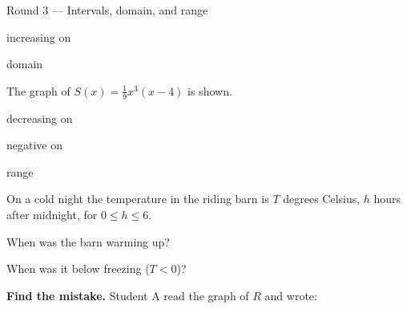 \begin{notesbox}{Round 3 --- Intervals, domain, and range}
\begin{minipage}[t]{0.62\linewidth}
\vspace{6pt}
increasing on 

\vspace{6pt}
domain \ans{$(-\infty,\,\infty)$}
\end{minipage}\hfill
\begin{minipage}[t]{0.34\linewidth}
\vspace{0pt}\centering
\gK[0.36]
\end{minipage}

\vspace{6pt}
\begin{minipage}[t]{0.62\linewidth}
\vspace{0pt}
\; The graph of $S(x)=\tfrac19x^3(x-4)$ is shown.

\vspace{6pt}
decreasing on 

\vspace{6pt}
negative on 

\vspace{6pt}
range \ans{$[-3,\,\infty)$}
\end{minipage}\hfill
\begin{minipage}[t]{0.34\linewidth}
\vspace{0pt}\centering
\gS[0.36]
\end{minipage}

\vspace{6pt}
\begin{minipage}[t]{0.62\linewidth}
\vspace{0pt}
\; On a cold night the temperature in the riding barn is $T$ degrees Celsius, $h$ hours
after midnight, for $0\le h\le6$.

\vspace{6pt}
When was the barn warming up? 

\vspace{6pt}
When was it below freezing ($T<0$)? \ans{$[0,\,2)\cup(2,\,5)$}
\end{minipage}\hfill
\begin{minipage}[t]{0.34\linewidth}
\vspace{0pt}\centering
\gT[0.36]
\end{minipage}

\vspace{8pt}
\begin{minipage}[t]{0.62\linewidth}
\vspace{0pt}
\textbf{Find the mistake.} Student A read the graph of $R$ and wrote:


\end{minipage}
\end{notesbox}
